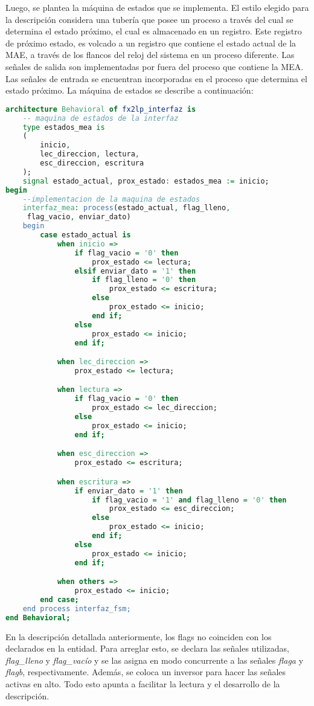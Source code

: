 Luego, se plantea la máquina de estados que se implementa. El estilo elegido para la descripción considera una tubería que posee un proceso a través del cual se determina el estado próximo, el cual es almacenado en un registro. Este registro de próximo estado, es volcado a un registro que contiene el estado actual de la MAE, a través de los flancos del reloj del sistema en un proceso diferente. Las señales de salida son implementadas por fuera del proceso que contiene la MEA. Las señales de entrada se encuentran incorporadas en el proceso que determina el estado próximo.
La máquina de estados se describe a continuación:
\begin{lstlisting}[language=VHDL,backgroundcolor=\color{gray!30}]
architecture Behavioral of fx2lp_interfaz is
	-- maquina de estados de la interfaz
	type estados_mea is
	(
		inicio,
		lec_direccion, lectura,
		esc_direccion, escritura
	);
	signal estado_actual, prox_estado: estados_mea := inicio;
begin
	--implementacion de la maquina de estados
	interfaz_mea: process(estado_actual, flag_lleno,
	 flag_vacio, enviar_dato)
	begin
		case estado_actual is
			when inicio =>
				if flag_vacio = '0' then
					prox_estado <= lectura;
				elsif enviar_dato = '1' then
					if flag_lleno = '0' then
						prox_estado <= escritura;
					else
						prox_estado <= inicio;
					end if;
				else
					prox_estado <= inicio;
				end if;

			when lec_direccion =>
				prox_estado <= lectura;

			when lectura =>
				if flag_vacio = '0' then
					prox_estado <= lec_direccion;
				else
					prox_estado <= inicio;
				end if;

			when esc_direccion =>
				prox_estado <= escritura;

			when escritura =>
				if enviar_dato = '1' then
					if flag_vacio = '1' and flag_lleno = '0' then
						prox_estado <= esc_direccion;
					else
						prox_estado <= inicio;
					end if;
				else
					prox_estado <= inicio;
				end if;

			when others =>
				prox_estado <= inicio;
		end case;
	end process interfaz_fsm;
end Behavioral;
\end{lstlisting}

En la descripción detallada anteriormente, los flags no coinciden con los declarados en la entidad. Para arreglar esto, se declara las señales utilizadas, {\it flag\_lleno} y {\it flag\_vacío} y se las asigna en modo concurrente a las señales {\it flaga} y {\it flagb}, respectivamente. Además, se coloca un inversor para hacer las señales activas en alto. Todo esto apunta a facilitar la lectura y el desarrollo de la descripción.

